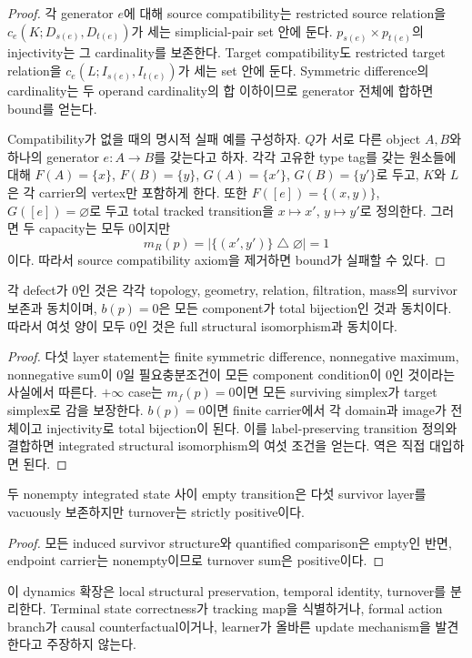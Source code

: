 \begin{proof}
각 generator $e$에 대해 source compatibility는 restricted source relation을
$c_e(K;D_{s(e)},D_{t(e)})$가 세는 simplicial-pair set 안에 둔다.
$p_{s(e)}\times p_{t(e)}$의 injectivity는 그 cardinality를 보존한다. Target
compatibility도 restricted target relation을
$c_e(L;I_{s(e)},I_{t(e)})$가 세는 set 안에 둔다. Symmetric difference의
cardinality는 두 operand cardinality의 합 이하이므로 generator 전체에 합하면
bound를 얻는다.

Compatibility가 없을 때의 명시적 실패 예를 구성하자. $Q$가 서로 다른 object
$A,B$와 하나의 generator $e:A\to B$를 갖는다고 하자. 각각 고유한 type tag를
갖는 원소들에 대해 $F(A)=\{x\}$, $F(B)=\{y\}$,
$G(A)=\{x'\}$, $G(B)=\{y'\}$로 두고, $K$와 $L$은 각 carrier의
vertex만 포함하게 한다. 또한 $F([e])=\{(x,y)\}$,
$G([e])=\varnothing$로 두고 total tracked transition을 $x\mapsto x'$,
$y\mapsto y'$로 정의한다. 그러면 두 capacity는 모두 0이지만
\[
m_R(p)=|\{(x',y')\}\mathbin{\triangle}\varnothing|=1
\]
이다. 따라서 source compatibility axiom을 제거하면 bound가 실패할 수 있다.
\end{proof}

\begin{proposition}
각 defect가 0인 것은 각각 topology, geometry, relation, filtration, mass의
survivor 보존과 동치이며, $b(p)=0$은 모든 component가 total bijection인 것과
동치이다. 따라서 여섯 양이 모두 0인 것은 full structural isomorphism과
동치이다.
\end{proposition}

\begin{proof}
다섯 layer statement는 finite symmetric difference, nonnegative maximum,
nonnegative sum이 0일 필요충분조건이 모든 component condition이 0인 것이라는
사실에서 따른다. $+\infty$ case는 $m_f(p)=0$이면 모든 surviving simplex가
target simplex로 감을 보장한다. $b(p)=0$이면 finite carrier에서 각 domain과
image가 전체이고 injectivity로 total bijection이 된다. 이를 label-preserving
transition 정의와 결합하면 integrated structural isomorphism의 여섯 조건을
얻는다. 역은 직접 대입하면 된다.
\end{proof}

\begin{proposition}
두 nonempty integrated state 사이 empty transition은 다섯 survivor layer를
vacuously 보존하지만 turnover는 strictly positive이다.
\end{proposition}

\begin{proof}
모든 induced survivor structure와 quantified comparison은 empty인 반면,
endpoint carrier는 nonempty이므로 turnover sum은 positive이다.
\end{proof}

이 dynamics 확장은 local structural preservation, temporal identity, turnover를
분리한다. Terminal state correctness가 tracking map을 식별하거나, formal action
branch가 causal counterfactual이거나, learner가 올바른 update mechanism을
발견한다고 주장하지 않는다.
